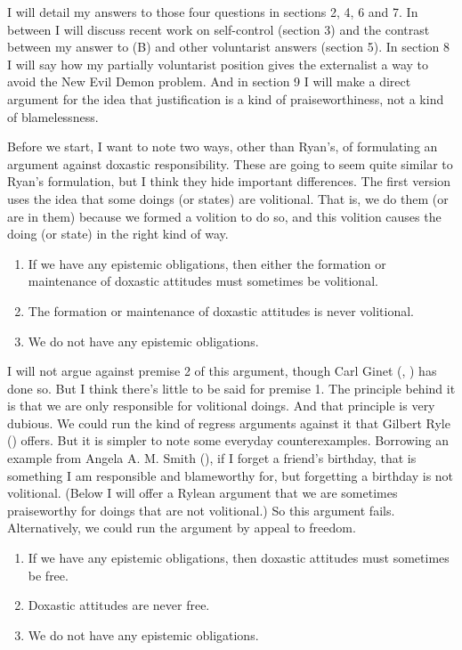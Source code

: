 \documentclass[
  11pt,
  letterpaper,
  DIV=11,
  numbers=noendperiod,
  oneside]{scrartcl}
\providecommand{\tightlist}{%
  \setlength{\itemsep}{0pt}\setlength{\parskip}{0pt}}\usepackage{longtable,booktabs,array}
\begin{document}
I will detail my answers to those four questions in sections 2, 4, 6 and
7. In between I will discuss recent work on self-control (section 3) and
the contrast between my answer to (B) and other voluntarist answers
(section 5). In section 8 I will say how my partially voluntarist
position gives the externalist a way to avoid the New Evil Demon
problem. And in section 9 I will make a direct argument for the idea
that justification is a kind of praiseworthiness, not a kind of
blamelessness.

Before we start, I want to note two ways, other than Ryan's, of
formulating an argument against doxastic responsibility. These are going
to seem quite similar to Ryan's formulation, but I think they hide
important differences. The first version uses the idea that some doings
(or states) are volitional. That is, we do them (or are in them) because
we formed a volition to do so, and this volition causes the doing (or
state) in the right kind of way.

\begin{enumerate}
\def\labelenumi{\arabic{enumi}.}
\tightlist
\item
  If we have any epistemic obligations, then either the formation or
  maintenance of doxastic attitudes must sometimes be volitional.
\item
  The formation or maintenance of doxastic attitudes is never
  volitional.
\item
  We do not have any epistemic obligations.
\end{enumerate}

I will not argue against premise 2 of this argument, though Carl Ginet
(, ) has
done so. But I think there's little to be said for premise 1. The
principle behind it is that we are only responsible for volitional
doings. And that principle is very dubious. We could run the kind of
regress arguments against it that Gilbert Ryle
() offers. But it is simpler to note some
everyday counterexamples. Borrowing an example from Angela A. M. Smith
(), if I forget a friend's birthday,
that is something I am responsible and blameworthy for, but forgetting a
birthday is not volitional. (Below I will offer a Rylean argument that
we are sometimes praiseworthy for doings that are not volitional.) So
this argument fails. Alternatively, we could run the argument by appeal
to freedom.

\begin{enumerate}
\def\labelenumi{\arabic{enumi}.}
\tightlist
\item
  If we have any epistemic obligations, then doxastic attitudes must
  sometimes be free.
\item
  Doxastic attitudes are never free.
\item
  We do not have any epistemic obligations.
\end{enumerate}
\end{document}
